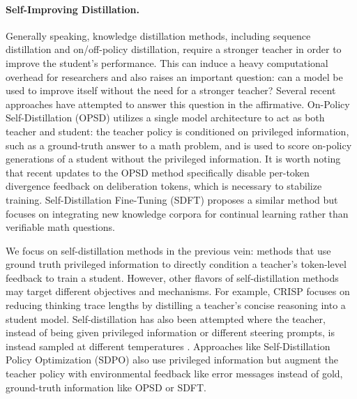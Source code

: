 \paragraph{Self-Improving Distillation.}
Generally speaking, knowledge distillation methods, including sequence
distillation and on/off-policy distillation, require a stronger teacher in order
to improve the student's performance. This can induce a heavy computational
overhead for researchers and also raises an important question: can a model be
used to improve itself without the need for a stronger teacher? Several recent
approaches have attempted to answer this question in the affirmative.
On-Policy Self-Distillation (OPSD)
\cite{zhao2026selfdistilledreasoneronpolicyselfdistillation} utilizes a single
model architecture to act as both teacher and student: the teacher policy is
conditioned on privileged information, such as a ground-truth answer to a math
problem, and is used to score on-policy generations of a student without the
privileged information. It is worth noting that recent updates to the OPSD
method specifically disable per-token divergence feedback on deliberation
tokens, which is necessary to stabilize training. Self-Distillation Fine-Tuning
(SDFT) \cite{shenfeld2026self} proposes a similar method but focuses on
integrating new knowledge corpora for continual learning rather than verifiable
math questions.

We focus on self-distillation methods in the previous vein: methods that use
ground truth privileged information to directly condition a teacher's
token-level feedback to train a student. However, other flavors of
self-distillation methods may target different objectives and mechanisms. For
example, CRISP \cite{sang2026policy} focuses on reducing thinking trace lengths
by distilling a teacher's concise reasoning into a student model.
Self-distillation has also been attempted where the teacher, instead of being
given privileged information or different steering prompts, is instead sampled
at different temperatures \cite{zhang2026embarrassingly}. Approaches like
Self-Distillation Policy Optimization (SDPO)
\cite{hubotter2026reinforcement} also use privileged information but augment
the teacher policy with environmental feedback like error messages instead of
gold, ground-truth information like OPSD or SDFT.

